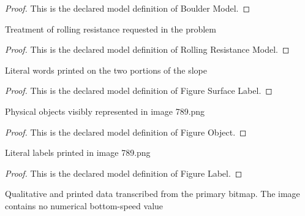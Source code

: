 \begin{proof}
  This is the declared model definition of Boulder Model.
\end{proof}
\begin{definition}
  \label{def:physics:phyx-mini-0789:phyxminiproblems-problemphyxmini0789-rollingresistancemodel}
  Treatment of rolling resistance requested in the problem
\end{definition}
\begin{proof}
  This is the declared model definition of Rolling Resistance Model.
\end{proof}
\begin{definition}
  \label{def:physics:phyx-mini-0789:phyxminiproblems-problemphyxmini0789-figuresurfacelabel}
  Literal words printed on the two portions of the slope
\end{definition}
\begin{proof}
  This is the declared model definition of Figure Surface Label.
\end{proof}
\begin{definition}
  \label{def:physics:phyx-mini-0789:phyxminiproblems-problemphyxmini0789-figureobject}
  Physical objects visibly represented in image 789.png
\end{definition}
\begin{proof}
  This is the declared model definition of Figure Object.
\end{proof}
\begin{definition}
  \label{def:physics:phyx-mini-0789:phyxminiproblems-problemphyxmini0789-figurelabel}
  Literal labels printed in image 789.png
\end{definition}
\begin{proof}
  This is the declared model definition of Figure Label.
\end{proof}
\begin{definition}
  \label{def:physics:phyx-mini-0789:phyxminiproblems-problemphyxmini0789-boulderhillfigure}
  Qualitative and printed data transcribed from the primary bitmap. The image contains no numerical bottom-speed value
\end{definition}
